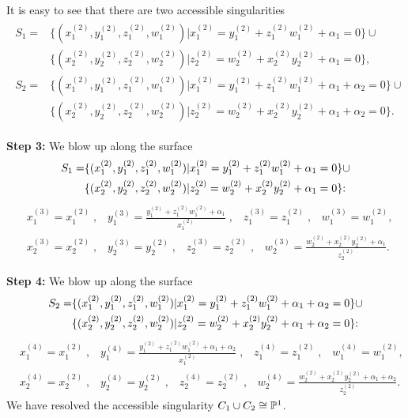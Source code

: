 It is easy to see that there are two accessible singularities
\begin{align*}
\begin{split}
S_1=&\{(x_{1}^{(2)},y_{1}^{(2)},z_{1}^{(2)},w_{1}^{(2)})|x_{1}^{(2)}=y_{1}^{(2)}+z_{1}^{(2)}w_{1}^{(2)}+\alpha_1=0\} \cup\\
&\{(x_{2}^{(2)},y_{2}^{(2)},z_{2}^{(2)},w_{2}^{(2)})|z_{2}^{(2)}=w_{2}^{(2)}+x_{2}^{(2)}y_{2}^{(2)}+\alpha_1=0\},\\
S_2=&\{(x_{1}^{(2)},y_{1}^{(2)},z_{1}^{(2)},w_{1}^{(2)})|x_{1}^{(2)}=y_{1}^{(2)}+z_{1}^{(2)}w_{1}^{(2)}+\alpha_1+\alpha_2=0\} \cup \\
&\{(x_{2}^{(2)},y_{2}^{(2)},z_{2}^{(2)},w_{2}^{(2)})|z_{2}^{(2)}=w_{2}^{(2)}+x_{2}^{(2)}y_{2}^{(2)}+\alpha_1+\alpha_2=0\}.
\end{split}
\end{align*}


{\bf Step 3:} We blow up along the surface
\begin{align*}
S_1=&\{(x_{1}^{(2)},y_{1}^{(2)},z_{1}^{(2)},w_{1}^{(2)})|x_{1}^{(2)}=y_{1}^{(2)}+z_{1}^{(2)}w_{1}^{(2)}+\alpha_1=0\} \cup\\
&\{(x_{2}^{(2)},y_{2}^{(2)},z_{2}^{(2)},w_{2}^{(2)})|z_{2}^{(2)}=w_{2}^{(2)}+x_{2}^{(2)}y_{2}^{(2)}+\alpha_1=0\}{\rm : \rm}
\end{align*}
\begin{align*}
&{x_{1}^{(3)}}=x_{1}^{(2)} \;, \;\;\; {y_{1}^{(3)}}=\frac{y_{1}^{(2)}+z_{1}^{(2)}w_{1}^{(2)}+\alpha_1}{x_{1}^{(2)}} \;, \;\;\; {z_{1}^{(3)}}=z_{1}^{(2)} \;, \;\;\; {w_{1}^{(3)}}=w_{1}^{(2)},\\
&{x_{2}^{(3)}}=x_{2}^{(2)} \;, \;\;\; {y_{2}^{(3)}}=y_{2}^{(2)} \;, \;\;\; {z_{2}^{(3)}}=z_{2}^{(2)} \;, \;\;\; {w_{2}^{(3)}}=\frac{w_{2}^{(2)}+x_{2}^{(2)}y_{2}^{(2)}+\alpha_1}{z_{2}^{(2)}}.
\end{align*}

{\bf Step 4:} We blow up along the surface
\begin{align*}
S_2=&\{(x_{1}^{(2)},y_{1}^{(2)},z_{1}^{(2)},w_{1}^{(2)})|x_{1}^{(2)}=y_{1}^{(2)}+z_{1}^{(2)}w_{1}^{(2)}+\alpha_1+\alpha_2=0\} \cup\\
&\{(x_{2}^{(2)},y_{2}^{(2)},z_{2}^{(2)},w_{2}^{(2)})|z_{2}^{(2)}=w_{2}^{(2)}+x_{2}^{(2)}y_{2}^{(2)}+\alpha_1+\alpha_2=0\}{\rm : \rm}
\end{align*}
\begin{align*}
&{x_{1}^{(4)}}=x_{1}^{(2)} \;, \;\;\; {y_{1}^{(4)}}=\frac{y_{1}^{(2)}+z_{1}^{(2)}w_{1}^{(2)}+\alpha_1+\alpha_2}{x_{1}^{(2)}} \;, \;\;\; {z_{1}^{(4)}}=z_{1}^{(2)} \;, \;\;\; {w_{1}^{(4)}}=w_{1}^{(2)},\\
&{x_{2}^{(4)}}=x_{2}^{(2)} \;, \;\;\; {y_{2}^{(4)}}=y_{2}^{(2)} \;, \;\;\; {z_{2}^{(4)}}=z_{2}^{(2)} \;, \;\;\; {w_{2}^{(4)}}=\frac{w_{2}^{(2)}+x_{2}^{(2)}y_{2}^{(2)}+\alpha_1+\alpha_2}{z_{2}^{(2)}}.
\end{align*}
We have resolved the accessible singularity $C_1 \cup C_2 \cong {\Bbb P}^1$.

